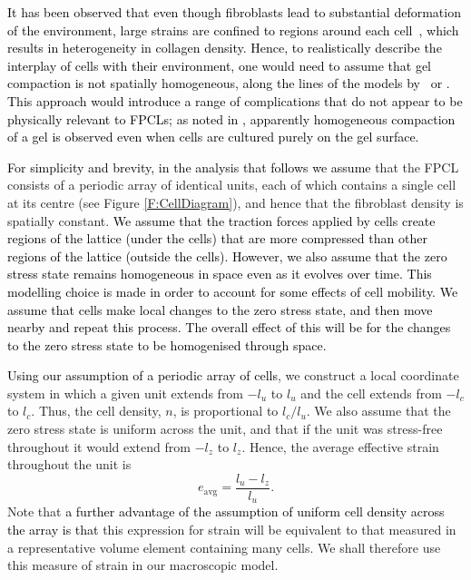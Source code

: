 \textcolor{black}{It has been observed that even though fibroblasts lead to substantial deformation of the environment, large strains are confined to regions around each cell~\citep{Sander2013}, which results in heterogeneity in collagen density. Hence, to realistically describe the interplay of cells with their environment, one would need to assume that gel compaction is not spatially homogeneous, along the lines of the models by~\citet{Evans2009} or \citet{Stevenson2010}. This approach would introduce a range of complications that do not appear to be physically relevant to FPCLs; as noted in \cite{Grinnell1984}, apparently homogeneous compaction of a gel is observed even when cells are cultured purely on the gel surface.}

\textcolor{black}{For simplicity and brevity, in the analysis that follows we assume} that the FPCL consists of a periodic array of identical units, each of which contains a single cell at its centre (see Figure \ref{F:CellDiagram}), and hence that the fibroblast density is spatially constant. \textcolor{black}{We assume that the traction forces applied by cells create regions of the lattice (under the cells) that are more compressed than other regions of the lattice (outside the cells). However, we also assume that the zero stress state remains homogeneous in space even as it evolves over time. This modelling choice is made in order to account for some effects of cell mobility. We assume that cells make local changes to the zero stress state, and then move nearby and repeat this process. The overall effect of this will be for the changes to the zero stress state to be homogenised through space.}

\textcolor{black}{Using our assumption of a periodic array of cells}, we construct a local coordinate system in which a given unit extends from $-l_u$ to $l_u$ and the cell extends from $-l_c$ to $l_c$. Thus, the cell density, $n$, is proportional to $l_c/l_u$. We also assume that the zero stress state is uniform across the unit, and that if the unit was stress-free throughout it would extend from $-l_{z}$ to $l_{z}$. Hence, the average effective strain throughout the unit is
\begin{equation}
 e_\text{avg} = \frac{l_u-l_z}{l_u}. \label{eavgdefn}
\end{equation}
Note that \textcolor{black}{a further advantage of the assumption of uniform cell density across the array is that} this expression for strain will be equivalent to that measured in a representative volume element containing many cells. We shall therefore use this measure of strain in our macroscopic model.

